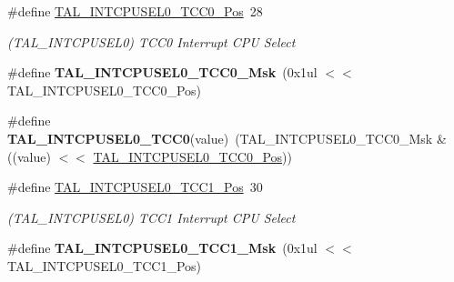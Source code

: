 \begin{DoxyCompactItemize}
\item 
\hypertarget{group___s_a_m_l21___t_a_l_gaa33f479c2347f12318958c6cef976a0b}{}\#define \hyperlink{group___s_a_m_l21___t_a_l_gaa33f479c2347f12318958c6cef976a0b}{T\+A\+L\+\_\+\+I\+N\+T\+C\+P\+U\+S\+E\+L0\+\_\+\+T\+C\+C0\+\_\+\+Pos}~28\label{group___s_a_m_l21___t_a_l_gaa33f479c2347f12318958c6cef976a0b}

\begin{DoxyCompactList}\small\item\em (T\+A\+L\+\_\+\+I\+N\+T\+C\+P\+U\+S\+E\+L0) T\+C\+C0 Interrupt C\+P\+U Select \end{DoxyCompactList}\item 
\hypertarget{group___s_a_m_l21___t_a_l_ga176b47203095d01f567450cc18f92487}{}\#define {\bfseries T\+A\+L\+\_\+\+I\+N\+T\+C\+P\+U\+S\+E\+L0\+\_\+\+T\+C\+C0\+\_\+\+Msk}~(0x1ul $<$$<$ T\+A\+L\+\_\+\+I\+N\+T\+C\+P\+U\+S\+E\+L0\+\_\+\+T\+C\+C0\+\_\+\+Pos)\label{group___s_a_m_l21___t_a_l_ga176b47203095d01f567450cc18f92487}

\item 
\hypertarget{group___s_a_m_l21___t_a_l_ga99b805595b1590394390b80191333742}{}\#define {\bfseries T\+A\+L\+\_\+\+I\+N\+T\+C\+P\+U\+S\+E\+L0\+\_\+\+T\+C\+C0}(value)~(T\+A\+L\+\_\+\+I\+N\+T\+C\+P\+U\+S\+E\+L0\+\_\+\+T\+C\+C0\+\_\+\+Msk \& ((value) $<$$<$ \hyperlink{group___s_a_m_l21___t_a_l_gaa33f479c2347f12318958c6cef976a0b}{T\+A\+L\+\_\+\+I\+N\+T\+C\+P\+U\+S\+E\+L0\+\_\+\+T\+C\+C0\+\_\+\+Pos}))\label{group___s_a_m_l21___t_a_l_ga99b805595b1590394390b80191333742}

\item 
\hypertarget{group___s_a_m_l21___t_a_l_gae9fa0a724a12f0a7be36f0e91d35be8e}{}\#define \hyperlink{group___s_a_m_l21___t_a_l_gae9fa0a724a12f0a7be36f0e91d35be8e}{T\+A\+L\+\_\+\+I\+N\+T\+C\+P\+U\+S\+E\+L0\+\_\+\+T\+C\+C1\+\_\+\+Pos}~30\label{group___s_a_m_l21___t_a_l_gae9fa0a724a12f0a7be36f0e91d35be8e}

\begin{DoxyCompactList}\small\item\em (T\+A\+L\+\_\+\+I\+N\+T\+C\+P\+U\+S\+E\+L0) T\+C\+C1 Interrupt C\+P\+U Select \end{DoxyCompactList}\item 
\hypertarget{group___s_a_m_l21___t_a_l_gaa8cad319bd534aba4b6c98cdde473d60}{}\#define {\bfseries T\+A\+L\+\_\+\+I\+N\+T\+C\+P\+U\+S\+E\+L0\+\_\+\+T\+C\+C1\+\_\+\+Msk}~(0x1ul $<$$<$ T\+A\+L\+\_\+\+I\+N\+T\+C\+P\+U\+S\+E\+L0\+\_\+\+T\+C\+C1\+\_\+\+Pos)\label{group___s_a_m_l21___t_a_l_gaa8cad319bd534aba4b6c98cdde473d60}


\end{DoxyCompactItemize}

